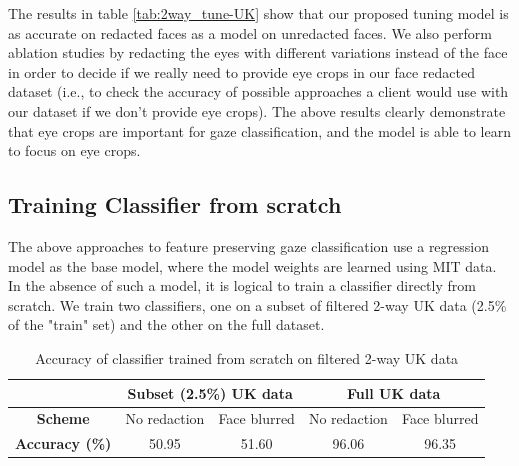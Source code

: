 
The results in table \ref{tab:2way_tune-UK} show that our proposed tuning model is as accurate on redacted faces as a model on unredacted faces. We also perform ablation studies by redacting the eyes with different variations instead of the face in order to decide if we really need to provide eye crops in our face redacted dataset (i.e., to check the accuracy of possible approaches a client would use with our dataset if we don’t provide eye crops). The above results clearly demonstrate that eye crops are important for gaze classification, and the model is able to learn to focus on eye crops.


\subsection{Training Classifier from scratch}
The above approaches to feature preserving gaze classification use a regression model as the base model, where the model weights are learned using MIT data. In the absence of such a model, it is logical to train a classifier directly from scratch. We train two classifiers, one on a subset of filtered 2-way UK data (2.5\% of the "train" set) and the other on the full dataset.

\begin{table}[h]
  \centering
    \caption[Accuracy of classifier on filtered 2-way UK data]{Accuracy of classifier trained from scratch on filtered 2-way UK data}
    \label{tab:2way_directClassif_UK}
    \begin{tabular}{|c||c|c|c|c|}
      \hline
      & \multicolumn{2}{c|}{\textbf{Subset (2.5\%) UK data}} & \multicolumn{2}{c|}{\textbf{Full UK data}} \\
      \hline
      \textbf{Scheme} & No redaction & Face blurred & No redaction & Face blurred \\
      \hline
      \textbf{Accuracy (\%)} & 50.95 & 51.60 & 96.06 & 96.35 \\
      \hline
    \end{tabular}  
\end{table}

